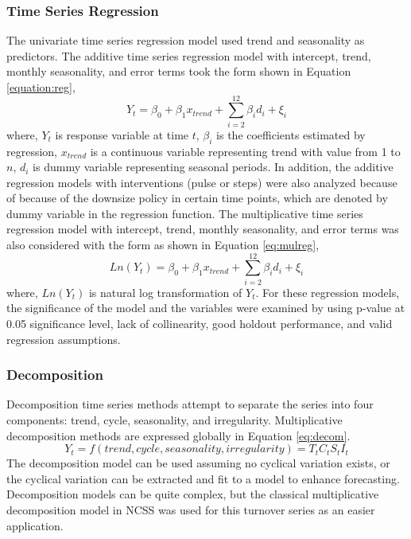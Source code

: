 \subsubsection{Time Series Regression}
The univariate time series regression model used trend and seasonality as predictors. The additive time series regression model with intercept, trend, monthly seasonality, and error terms took the form shown in Equation \ref{equation:reg},
\begin{equation}
	\label{equation:reg}
	Y_t = \beta_0+\beta_1 x_{trend} + \sum_{i=2}^{12} {\beta_i d_i}+\xi_i
\end{equation}
where, $Y_t$ is response variable at time $t$,  $\beta_i$ is the coefficients estimated by regression, $x_{trend}$ is a continuous variable representing trend with value from 1 to $n$, $d_i$ is dummy variable representing seasonal periods. In addition, the additive regression models with interventions (pulse or steps) were also analyzed because of because of the downsize policy in certain time points, which are denoted by dummy variable in the regression function. The multiplicative time series regression model with intercept, trend, monthly seasonality, and error terms was also considered with the form as shown in Equation \ref{eq:mulreg},
\begin{equation}
	\label{eq:mulreg}
	Ln(Y_t)=\beta_0+\beta_1 x_{trend} +\sum_{i=2}^{12} {\beta_i d_i}+\xi_i                              
\end{equation}
where, $Ln(Y_t)$ is natural log transformation of $Y_t$. For these regression models, the significance of the model and the variables were examined by using p-value at 0.05 significance level, lack of collinearity, good holdout performance, and valid regression assumptions. 
\subsubsection{Decomposition}
Decomposition time series methods attempt to separate the series into four components: trend, cycle, seasonality, and irregularity. Multiplicative decomposition methods are expressed globally in Equation \ref{eq:decom}.  
\begin{equation}
	\label{eq:decom}
	Y_t  =f(trend,cycle,seasonality,irregularity)=T_t  C_t S_t I_t            
\end{equation}
The decomposition model can be used assuming no cyclical variation exists, or the cyclical variation can be extracted and fit to  a model to enhance forecasting. Decomposition models can be quite complex, but the classical multiplicative decomposition model in NCSS was used for this turnover series as an easier application.

